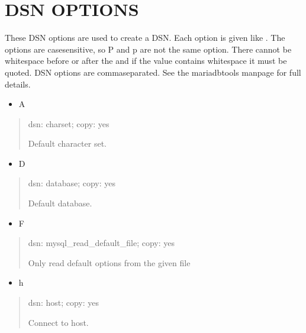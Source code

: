 \documentclass[letterpaper,10pt,english]{sphinxmanual}
\begin{document}
\section{DSN OPTIONS}
\label{\detokenize{mariadb-index-checker:dsn-options}}
\sphinxAtStartPar
These DSN options are used to create a DSN.  Each option is given like
.  The options are case\sphinxhyphen{}sensitive, so P and p are not the
same option.  There cannot be whitespace before or after the \sphinxcode{\sphinxupquote{=}} and
if the value contains whitespace it must be quoted.  DSN options are
comma\sphinxhyphen{}separated.  See the mariadb\sphinxhyphen{}tools manpage for full details.
\begin{itemize}
\item {} 
\sphinxAtStartPar
A

\end{itemize}
\begin{quote}

\sphinxAtStartPar
dsn: charset; copy: yes

\sphinxAtStartPar
Default character set.
\end{quote}
\begin{itemize}
\item {} 
\sphinxAtStartPar
D

\end{itemize}
\begin{quote}

\sphinxAtStartPar
dsn: database; copy: yes

\sphinxAtStartPar
Default database.
\end{quote}
\begin{itemize}
\item {} 
\sphinxAtStartPar
F

\end{itemize}
\begin{quote}

\sphinxAtStartPar
dsn: mysql\_read\_default\_file; copy: yes

\sphinxAtStartPar
Only read default options from the given file
\end{quote}
\begin{itemize}
\item {} 
\sphinxAtStartPar
h

\end{itemize}
\begin{quote}

\sphinxAtStartPar
dsn: host; copy: yes

\sphinxAtStartPar
Connect to host.
\end{quote}
\end{document}
